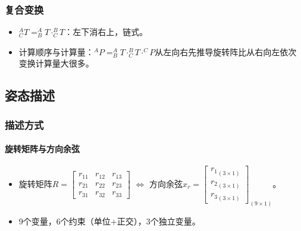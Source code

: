 \documentclass[
12pt, %
a4paper, 
oneside, %
headinclude,footinclude, %
]{scrartcl}
\begin{document}
\subsubsection{复合变换}
\begin{itemize}
\item $ ^A_C T = ^A_B T \cdot ^B_C T $：左下消右上，链式。
\item 计算顺序与计算量：$ ^A P = ^A_B T \cdot ^B_C T \cdot ^C P $从左向右先推导旋转阵比从右向左依次变换计算量大很多。
\end{itemize}
\subsection{姿态描述}
\subsubsection{描述方式}
\paragraph{旋转矩阵与方向余弦}
\begin{itemize}
\item 旋转矩阵$ R = \begin{bmatrix} r_{11} & r_{12} & r_{13} \\ r_{21} & r_{22} & r_{23} \\ r_{31} & r_{32} & r_{33} \end{bmatrix} $
$ \Leftrightarrow $
方向余弦$ x_r = \begin{bmatrix} {r_1}_{(3 \times 1)} \\ {r_2}_{(3 \times 1)} \\ {r_3}_{(3 \times 1)} \end{bmatrix}_{(9 \times 1)} $。
\item $ 9 $个变量，$ 6 $个约束（单位+正交），$ 3 $个独立变量。
\end{itemize}
\end{document}
